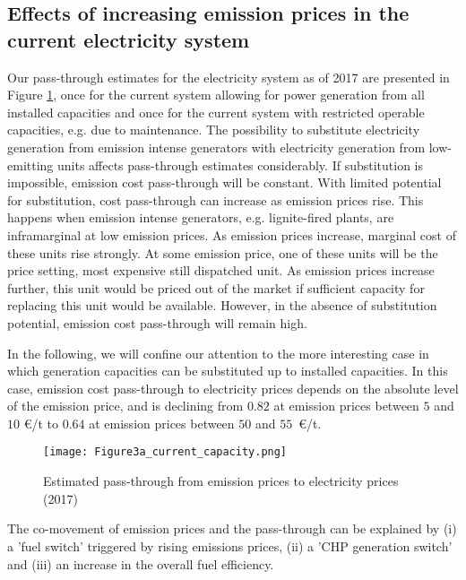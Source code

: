 \documentclass[preprint, 12pt, authoryear]{elsarticle}
\begin{document}
\subsection{Effects of increasing emission prices in the current electricity system}
Our pass-through estimates for the electricity system as of 2017 are presented in Figure \ref{Fig3}, once for the current system allowing for power generation from all installed capacities and once for the current system with restricted operable capacities, e.g. due to maintenance. 
The possibility to substitute electricity generation from emission intense generators with electricity generation from low-emitting units affects pass-through estimates considerably.
If substitution is impossible, emission cost pass-through will be constant. 
With limited potential for substitution, cost pass-through can increase as emission prices rise. This happens when emission intense generators, e.g. lignite-fired plants, are inframarginal at low emission prices. As emission prices increase, marginal cost of these units rise strongly. At some emission price, one of these units will be the price setting, most expensive still dispatched unit. As emission prices increase further, this unit would be priced out of the market if sufficient capacity for replacing this unit would be available. 
However, in the absence of substitution potential, emission cost pass-through will remain high.

In the following, we will confine our attention to the more interesting case in which generation capacities can be substituted up to installed capacities. 
In this case, emission cost pass-through to electricity prices depends on the absolute level of the emission price, and is declining from $0.82$ at emission prices between $5$ and $10$ \euro{}/t to $0.64$ at emission prices between $50$ and $55$~\euro{}/t.

\begin{figure}[t]
\centering
\texttt{[image: Figure3a\_current\_capacity.png]}
\caption{Estimated pass-through from emission prices to electricity prices (2017)}\label{Fig3}
\end{figure}

The co-movement of  emission prices and the pass-through can be explained by (i) a 'fuel switch' triggered by rising emissions prices, (ii) a 'CHP generation switch' and (iii) an increase in the overall fuel efficiency.
\end{document}
